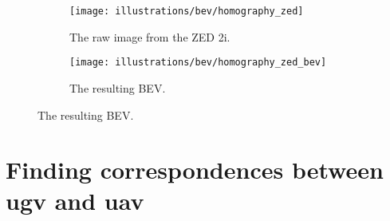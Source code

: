 \documentclass[aspectratio=169,hyperref={pdfpagelabels=false}]{beamer}
\begin{document}
    \begin{frame}
        \begin{figure}[ht!]
            \begin{subfigure}[t]{0.35\textwidth}
                \texttt{[image: illustrations/bev/homography\_zed]}
                \caption{The raw image from the ZED 2i.}
                \label{fig:homography:zed}
            \end{subfigure}
            \hfill
            \begin{subfigure}[t]{0.58\textwidth}
                \texttt{[image: illustrations/bev/homography\_zed\_bev]}
                \caption{The resulting BEV.}
                \label{fig:homography:zed_bev}
            \end{subfigure}
        \end{figure}
    \end{frame}
%
%


    \section{Finding correspondences between ugv and uav}
    \begin{frame}[tocremainder]
        \tableofcontents[currentsection]
    \end{frame}
\end{document}
